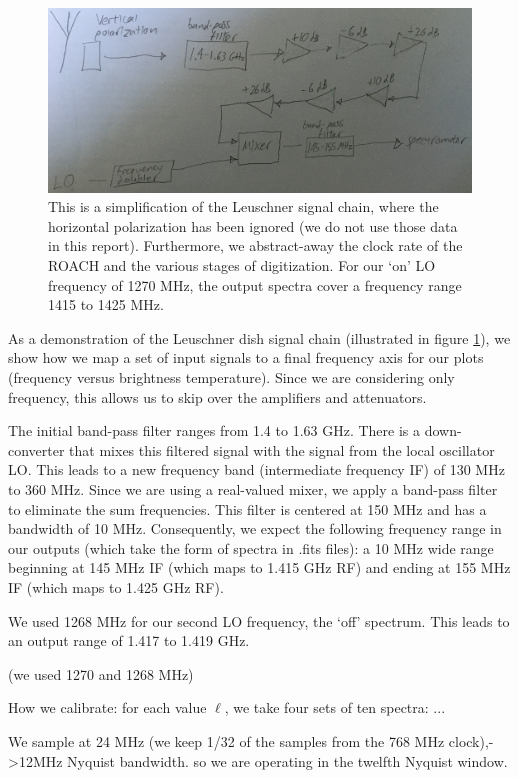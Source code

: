 \documentclass[12pt]{article}
\begin{document}
\begin{figure}
	\centering
	\includegraphics[width=.9\linewidth]{sig_chain}
	\caption{This is a simplification of the Leuschner signal chain, where the horizontal polarization has been ignored (we do not use those data in this report). Furthermore, we abstract-away the clock rate of the ROACH and the various stages of digitization. For our `on' LO frequency of 1270 MHz, the output spectra cover a frequency range 1415 to 1425 MHz.}
	\label{fig:sig_chain}
\end{figure}

As a demonstration of the Leuschner dish signal chain (illustrated in figure \ref{fig:sig_chain}), we show how we map a set of input signals to a final frequency axis for our plots (frequency versus brightness temperature). Since we are considering only frequency, this allows us to skip over the amplifiers and attenuators.

The initial band-pass filter ranges from 1.4 to 1.63 GHz. There is a down-converter that mixes this filtered signal with the signal from the local oscillator LO. This leads to a new frequency band (intermediate frequency IF) of 130 MHz to 360 MHz. Since we are using a real-valued mixer, we apply a band-pass filter to eliminate the sum frequencies. This filter is centered at 150 MHz and has a bandwidth of 10 MHz. Consequently, we expect the following frequency range in our outputs (which take the form of spectra in .fits files): a 10 MHz wide range beginning at 145 MHz IF (which maps to 1.415 GHz RF) and ending at 155 MHz IF (which maps to 1.425 GHz RF).

We used 1268 MHz for our second LO frequency, the `off' spectrum. This leads to an output range of 1.417 to 1.419 GHz.


(we used 1270 and 1268 MHz)

How we calibrate: for each value $\ell$, we take four sets of ten spectra: ...

We sample at 24 MHz (we keep 1/32 of the samples from the 768 MHz clock),->12MHz Nyquist bandwidth. so we are operating in the twelfth Nyquist window.
\end{document}
